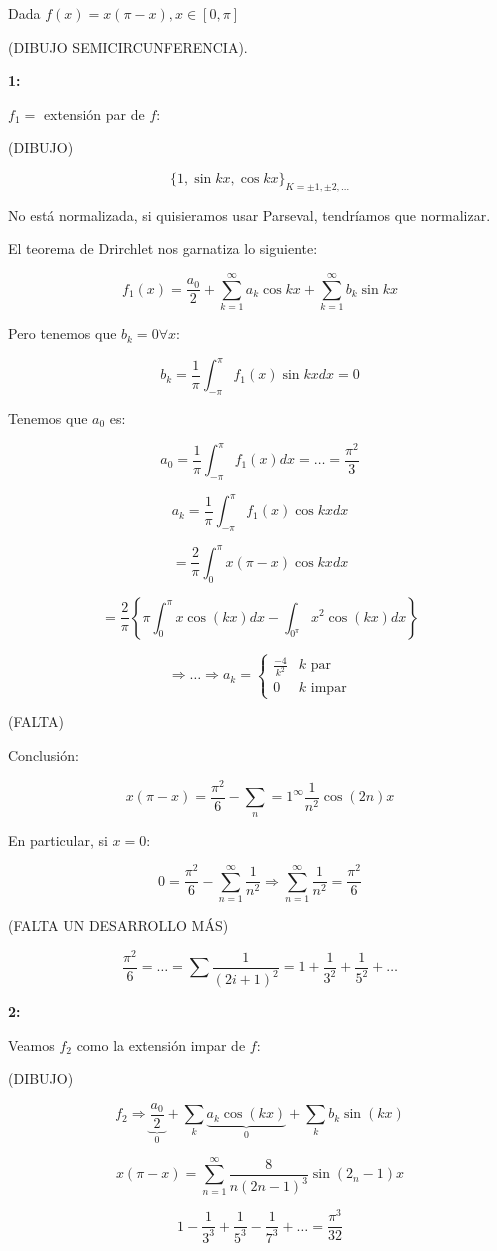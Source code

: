 	\begin{example}

		Dada $f(x) = x(\pi-x), x \in [0,\pi]$

		(DIBUJO SEMICIRCUNFERENCIA).

		\textbf{1:}

		$f_1 = $ extensión par de $f$:

		(DIBUJO)

		\[\{ 1, \sin{kx}, \cos{kx} \}_{K = ±1,±2,…} \]

		\obs No está normalizada, si quisieramos usar Parseval, tendríamos que normalizar.

		El teorema de Drirchlet nos garnatiza lo siguiente:

		\[
			f_1(x) = \frac{a_0}{2} + \sum_{k=1}^\infty a_k \cos{kx} + \sum_{k=1}^\infty b_k \sin kx
		\]

		Pero tenemos que $b_k = 0 \forall x$:

		\[b_k = \frac{1}{\pi} \int_{-\pi}^{\pi} f_1(x) \sin kx dx = 0 \]

		Tenemos que $a_0$ es:

		\[ a_0 = \frac{1}{\pi} \int_{-\pi}^{\pi} f_1(x) dx = … = \frac{\pi^2}{3} \]

		\[ a_k = \frac{1}{\pi} \int_{-\pi}^{\pi} f_1(x) \cos kx dx\]

		\[ = \frac{2}{\pi} \int_{0}^{\pi} x(\pi - x) \cos kx dx\]

		\[ = \frac{2}{\pi} \left\{ \pi \int_{0}^{\pi} x \cos(kx) dx  - \int_{0^π} x^2 \cos(kx) dx \right\}  \]

		\[ \Rightarrow … \Rightarrow a_k = \begin{cases}
			\frac{-4}{k^2} & k \text{ par} \\
			0 & k \text{ impar}
		\end{cases}  \]

		(FALTA)

		Conclusión:

		\[ x(\pi - x) = \frac{\pi^2}{6} -\sum_n=1^\infty \frac{1}{n^2} \cos(2n) x \]

		En particular, si $x=0$:

		\[ 0 = \frac{π^2}{6}  - \sum_{n=1}^\infty \frac{1}{n^2} \Rightarrow  \sum_{n=1}^\infty \frac{1}{n^2} = \frac{\pi^2}{6} \]

		(FALTA UN DESARROLLO MÁS)

		\[ \frac{\pi^2}{6} = … = \sum \frac{1}{(2i +1)^2}= 1 + \frac{1}{3^2} + \frac{1}{5^2} + … \]

		\textbf{2:}

		Veamos $f_2$ como la extensión impar de $f$:

		(DIBUJO)

		\[ f_2 \Rightarrow \underbrace{\frac{a_0}{2}}_{0} + \sum_k \underbrace{a_k \cos(kx)}_{0} + \sum_k b_k \sin(kx)  \]

		\[  x(\pi - x) = \sum_{n=1}^{\infty} \frac{8}{n(2n-1)^3} \sin(2_n-1)x  \]

		\[  1 - \frac{1}{3^3} + \frac{1}{5^3} - \frac{1}{7^3} + … = \frac{\pi^3}{32}\]


	\end{example}








